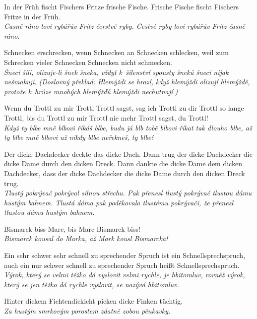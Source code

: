 \noindent
In der Früh fischt Fischers Fritze frische Fische. Frische Fische fischt Fischers Fritze in der Früh. \\
\textit{Časně ráno loví rybářův Fritz čerstvé ryby. Čestvé ryby loví rybářův Fritz časně ráno.}

\medskip

\noindent
Schnecken erschrecken, wenn Schnecken an Schnecken schlecken, weil zum Schrecken vieler Schnecken Schnecken nicht schmecken. \\ 
\textit{Šneci šílí, olizuje-li šnek šneka, vždyť k šílenství spousty šneků šneci nijak nešmakují. (Doslovný překlad: Hlemýždi se hrozí, když hlemýždi olizují hlemýždě, protože k hrůze mnohých hlemýžďů hlemýždi nechutnají.)}

\medskip

\noindent
Wenn du Trottl zu mir Trottl Trottl sagst, sag ich Trottl zu dir Trottl so lange Trottl, bis du Trottl zu mir Trottl nie mehr Trottl sagst, du Trottl! \\
\textit{Když ty blbe mně blbovi říkáš blbe, budu já blb tobě blbovi říkat tak dlouho blbe, až ty blbe mně blbovi už nikdy blbe neřekneš, ty blbe!}

\medskip

\noindent
Der dicke Dachdecker deckte das dicke Dach. Dann trug der dicke Dachdecker die dicke Dame durch den dicken Dreck. Dann dankte die dicke Dame dem dicken Dachdecker, dass der dicke Dachdecker die dicke Dame durch den dicken Dreck trug. \\
\textit{Tlustý pokrývač pokrýval silnou střechu. Pak přenesl tlustý pokrývač tlustou dámu hustým bahnem. Tlustá dáma pak poděkovala tlustému pokrývači, že přenesl tlustou dámu hustým bahnem.}

\medskip

\noindent
Bismarck biss Marc, bis Marc Bismarck biss! \\
\textit{Bismarck kousal do Marka, až Mark kousl Bismarcka!}

\medskip

\noindent
Ein sehr schwer sehr schnell zu sprechender Spruch ist ein Schnellsprechspruch, auch ein nur schwer schnell zu sprechender Spruch heißt Schnellsprechspruch. \\
\textit{Výrok, který se velmi těžko dá vyslovit velmi rychle, je hbitomluv, rovněž výrok, který se jen těžko dá rychle vyslovit, se nazývá hbitomluv. }

\medskip

\noindent
Hinter dickem Fichtendickicht picken dicke Finken tüchtig. \\
\textit{Za hustým smrkovým porostem zdatně zobou pěnkavky. }

